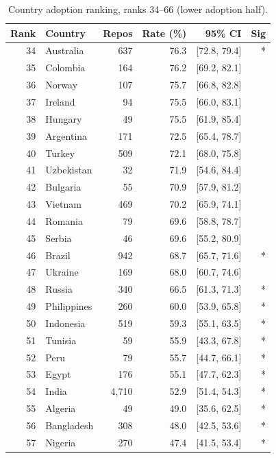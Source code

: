 \begin{table}[h]
\centering
\caption{Country adoption ranking, ranks 34--66 (lower adoption half).}
\label{tab:country_rank_lo}
\small
\begin{tabular}{@{}rlrrrr@{}}
\toprule
Rank & Country & Repos & Rate (\%) & 95\% CI & Sig \\
\midrule
34 & Australia    &   637 & 76.3 & [72.8, 79.4] & * \\
35 & Colombia     &   164 & 76.2 & [69.2, 82.1] &   \\
36 & Norway       &   107 & 75.7 & [66.8, 82.8] &   \\
37 & Ireland      &    94 & 75.5 & [66.0, 83.1] &   \\
38 & Hungary      &    49 & 75.5 & [61.9, 85.4] &   \\
39 & Argentina    &   171 & 72.5 & [65.4, 78.7] &   \\
40 & Turkey       &   509 & 72.1 & [68.0, 75.8] &   \\
41 & Uzbekistan   &    32 & 71.9 & [54.6, 84.4] &   \\
42 & Bulgaria     &    55 & 70.9 & [57.9, 81.2] &   \\
43 & Vietnam      &   469 & 70.2 & [65.9, 74.1] &   \\
44 & Romania      &    79 & 69.6 & [58.8, 78.7] &   \\
45 & Serbia       &    46 & 69.6 & [55.2, 80.9] &   \\
46 & Brazil       &   942 & 68.7 & [65.7, 71.6] & * \\
47 & Ukraine      &   169 & 68.0 & [60.7, 74.6] &   \\
48 & Russia       &   340 & 66.5 & [61.3, 71.3] & * \\
49 & Philippines  &   260 & 60.0 & [53.9, 65.8] & * \\
50 & Indonesia    &   519 & 59.3 & [55.1, 63.5] & * \\
51 & Tunisia      &    59 & 55.9 & [43.3, 67.8] & * \\
52 & Peru         &    79 & 55.7 & [44.7, 66.1] & * \\
53 & Egypt        &   176 & 55.1 & [47.7, 62.3] & * \\
54 & India        & 4,710 & 52.9 & [51.4, 54.3] & * \\
55 & Algeria      &    49 & 49.0 & [35.6, 62.5] & * \\
56 & Bangladesh   &   308 & 48.0 & [42.5, 53.6] & * \\
57 & Nigeria      &   270 & 47.4 & [41.5, 53.4] & * \\

\end{tabular}
\end{table}
